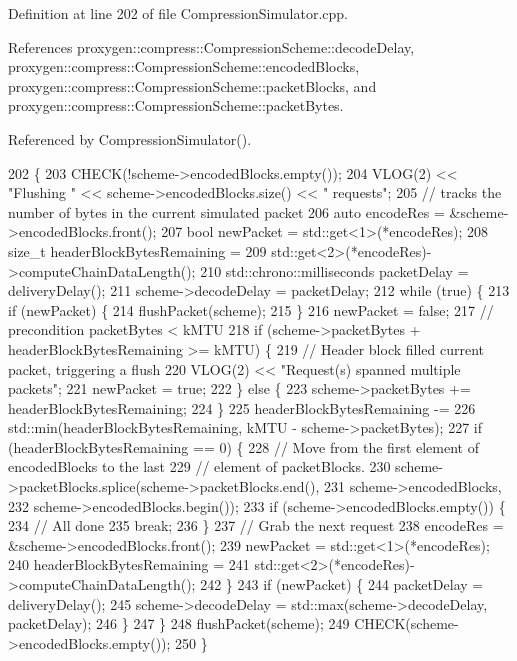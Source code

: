 Definition at line 202 of file Compression\+Simulator.\+cpp.



References proxygen\+::compress\+::\+Compression\+Scheme\+::decode\+Delay, proxygen\+::compress\+::\+Compression\+Scheme\+::encoded\+Blocks, proxygen\+::compress\+::\+Compression\+Scheme\+::packet\+Blocks, and proxygen\+::compress\+::\+Compression\+Scheme\+::packet\+Bytes.



Referenced by Compression\+Simulator().


\begin{DoxyCode}
202                                                                        \{
203   CHECK(!scheme->encodedBlocks.empty());
204   VLOG(2) << \textcolor{stringliteral}{"Flushing "} << scheme->encodedBlocks.size() << \textcolor{stringliteral}{" requests"};
205   \textcolor{comment}{// tracks the number of bytes in the current simulated packet}
206   \textcolor{keyword}{auto} encodeRes = &scheme->encodedBlocks.front();
207   \textcolor{keywordtype}{bool} newPacket = std::get<1>(*encodeRes);
208   \textcolor{keywordtype}{size\_t} headerBlockBytesRemaining =
209       std::get<2>(*encodeRes)->computeChainDataLength();
210   std::chrono::milliseconds packetDelay = deliveryDelay();
211   scheme->decodeDelay = packetDelay;
212   \textcolor{keywordflow}{while} (\textcolor{keyword}{true}) \{
213     \textcolor{keywordflow}{if} (newPacket) \{
214       flushPacket(scheme);
215     \}
216     newPacket = \textcolor{keyword}{false};
217     \textcolor{comment}{// precondition packetBytes < kMTU}
218     \textcolor{keywordflow}{if} (scheme->packetBytes + headerBlockBytesRemaining >= kMTU) \{
219       \textcolor{comment}{// Header block filled current packet, triggering a flush}
220       VLOG(2) << \textcolor{stringliteral}{"Request(s) spanned multiple packets"};
221       newPacket = \textcolor{keyword}{true};
222     \} \textcolor{keywordflow}{else} \{
223       scheme->packetBytes += headerBlockBytesRemaining;
224     \}
225     headerBlockBytesRemaining -=
226         std::min(headerBlockBytesRemaining, kMTU - scheme->packetBytes);
227     \textcolor{keywordflow}{if} (headerBlockBytesRemaining == 0) \{
228       \textcolor{comment}{// Move from the first element of encodedBlocks to the last}
229       \textcolor{comment}{// element of packetBlocks.}
230       scheme->packetBlocks.splice(scheme->packetBlocks.end(),
231                                   scheme->encodedBlocks,
232                                   scheme->encodedBlocks.begin());
233       \textcolor{keywordflow}{if} (scheme->encodedBlocks.empty()) \{
234         \textcolor{comment}{// All done}
235         \textcolor{keywordflow}{break};
236       \}
237       \textcolor{comment}{// Grab the next request}
238       encodeRes = &scheme->encodedBlocks.front();
239       newPacket = std::get<1>(*encodeRes);
240       headerBlockBytesRemaining =
241           std::get<2>(*encodeRes)->computeChainDataLength();
242     \}
243     \textcolor{keywordflow}{if} (newPacket) \{
244       packetDelay = deliveryDelay();
245       scheme->decodeDelay = std::max(scheme->decodeDelay, packetDelay);
246     \}
247   \}
248   flushPacket(scheme);
249   CHECK(scheme->encodedBlocks.empty());
250 \}
\end{DoxyCode}
